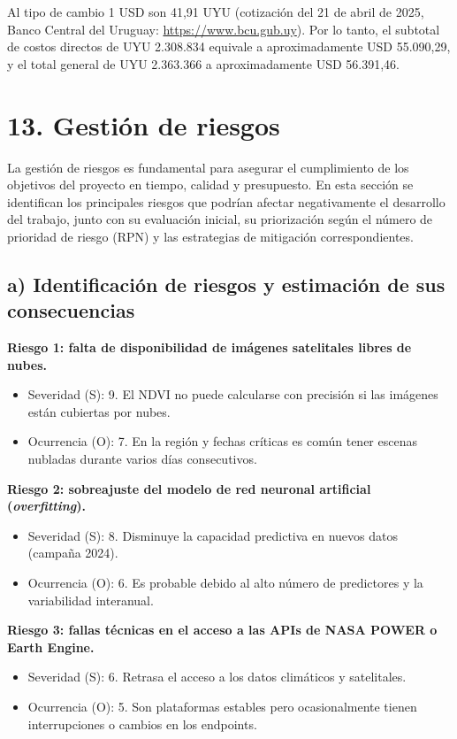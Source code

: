 \documentclass[
11pt, %
]{charter}
\begin{document}
Al tipo de cambio 1 USD son 41,91 UYU (cotización del 21 de abril de 2025, Banco Central del Uruguay: \url{https://www.bcu.gub.uy}). Por lo tanto, el subtotal de costos directos de UYU 2.308.834 equivale a aproximadamente USD 55.090,29,  
y el total general de UYU 2.363.366 a aproximadamente USD 56.391,46.




\section{13. Gestión de riesgos}
\label{sec:riesgos}

La gestión de riesgos es fundamental para asegurar el cumplimiento de los objetivos del proyecto en tiempo, calidad y presupuesto. En esta sección se identifican los principales riesgos que podrían afectar negativamente el desarrollo del trabajo, junto con su evaluación inicial, su priorización según el número de prioridad de riesgo (RPN) y las estrategias de mitigación correspondientes.

\subsection*{a) Identificación de riesgos y estimación de sus consecuencias}

\textbf{Riesgo 1: falta de disponibilidad de imágenes satelitales libres de nubes.}
\begin{itemize}
    \item Severidad (S): 9. El NDVI no puede calcularse con precisión si las imágenes están cubiertas por nubes.
    \item Ocurrencia (O): 7. En la región y fechas críticas es común tener escenas nubladas durante varios días consecutivos.
\end{itemize}

\textbf{Riesgo 2: sobreajuste del modelo de red neuronal artificial (\textit{overfitting}).}
\begin{itemize}
    \item Severidad (S): 8. Disminuye la capacidad predictiva en nuevos datos (campaña 2024).
    \item Ocurrencia (O): 6. Es probable debido al alto número de predictores y la variabilidad interanual.
\end{itemize}

\textbf{Riesgo 3: fallas técnicas en el acceso a las APIs de NASA POWER o Earth Engine.}
\begin{itemize}
    \item Severidad (S): 6. Retrasa el acceso a los datos climáticos y satelitales.
    \item Ocurrencia (O): 5. Son plataformas estables pero ocasionalmente tienen interrupciones o cambios en los endpoints.
\end{itemize}
\end{document}
